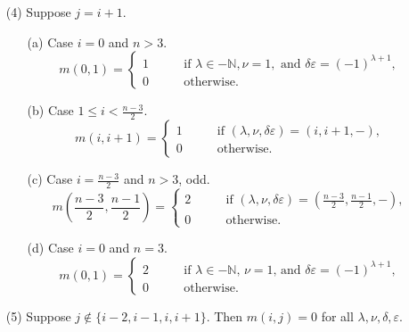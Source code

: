 \begin{theorem}
\begin{enumerate}
\item[{\rm{(4)}}]
Suppose $j=i+1$.  
\begin{enumerate}
\item[{\rm{(a)}}]
Case $i=0$ and $n>3$.
\begin{equation*}
m(0,1)
=
\begin{cases}
1
\qquad
&\text{if }
\lambda \in - {\mathbb{N}}, \nu=1, \text{ and }\delta\varepsilon = (-1)^{\lambda+1}, 
\\
0
&
\text{otherwise.}
\end{cases}
\end{equation*}
\item[{\rm{(b)}}]
Case $1 \le i < \frac{n-3}{2}$.  
\begin{equation*}
m(i,i+1)
=
\begin{cases}
1
\qquad
&\text{if }
(\lambda, \nu, \delta \varepsilon) =(i,i+1,-),  
\\
0 
&
\text{otherwise}.  
\end{cases}
\end{equation*}
\item[{\rm{(c)}}]
Case $i=\frac{n-3}{2}$ and $n>3$, odd.  
\begin{equation*}
m(\frac{n-3}{2}, \frac{n-1}{2})
=
\begin{cases}
2
\qquad
&\text{if }
(\lambda, \nu, \delta \varepsilon) =(\frac{n-3}{2},\frac{n-1}{2},-),  
\\
0 
&
\text{otherwise}.  
\end{cases}
\end{equation*}
\item[{\rm{(d)}}]
Case $i=0$ and $n=3$.  
\begin{equation*}
m(0, 1)
=
\begin{cases}
2
\qquad
&\text{if 
$\lambda \in -{\mathbb{N}}$, $\nu=1$, 
 and $\delta \varepsilon = (-1)^{\lambda+1}$},  
\\
0 
&
\text{otherwise}.  
\end{cases}
\end{equation*}
\end{enumerate}

\item[{\rm{(5)}}]
Suppose $j \not\in \{i-2, i-1, i, i+1\}$.
Then $m(i,j)=0$ for all $\lambda, \nu, \delta, \varepsilon$.
\end{enumerate}

\end{theorem}



